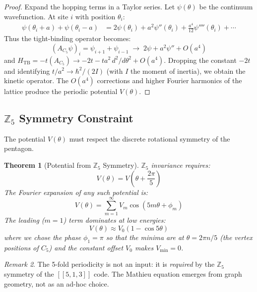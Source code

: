 \documentclass[11pt,a4paper]{article}
\newtheorem{theorem}{Theorem}[section]
\theoremstyle{definition}
\theoremstyle{remark}
\newtheorem{remark}[theorem]{Remark}
\begin{document}
\begin{proof}
Expand the hopping terms in a Taylor series. Let $\psi(\theta)$ be the continuum wavefunction. At site $i$ with position $\theta_i$:
\begin{align}
\psi(\theta_i + a) + \psi(\theta_i - a) &= 2\psi(\theta_i) + a^2\psi''(\theta_i) + \frac{a^4}{12}\psi''''(\theta_i) + \cdots
\end{align}
Thus the tight-binding operator becomes:
\begin{equation}
(A_{C_5}\psi)_i = \psi_{i+1} + \psi_{i-1} \;\longrightarrow\; 2\psi + a^2\psi'' + O(a^4)
\end{equation}
and $H_{\mathrm{TB}} = -t(A_{C_5}) \to -2t - ta^2\,d^2/d\theta^2 + O(a^4)$. Dropping the constant $-2t$ and identifying $t/a^2 \to \hbar^2/(2I)$ (with $I$ the moment of inertia), we obtain the kinetic operator. The $O(a^4)$ corrections and higher Fourier harmonics of the lattice produce the periodic potential $V(\theta)$.
\end{proof}

\subsection{$\mathbb{Z}_5$ Symmetry Constraint}

The potential $V(\theta)$ must respect the discrete rotational symmetry of the pentagon.

\begin{theorem}[Potential from $\mathbb{Z}_5$ Symmetry]
\label{thm:Z5}
$\mathbb{Z}_5$ invariance requires:
\begin{equation}
V(\theta) = V\!\left(\theta + \frac{2\pi}{5}\right)
\end{equation}
The Fourier expansion of any such potential is:
\begin{equation}
V(\theta) = \sum_{m=1}^{\infty} V_m \cos(5m\theta + \phi_m)
\end{equation}
The leading ($m=1$) term dominates at low energies:
\begin{equation}
V(\theta) \approx V_0(1 - \cos 5\theta)
\end{equation}
where we chose the phase $\phi_1 = \pi$ so that the minima are at $\theta = 2\pi n/5$ (the vertex positions of $C_5$) and the constant offset $V_0$ makes $V_{\min} = 0$.
\end{theorem}

\begin{remark}
The 5-fold periodicity is not an input: it is \emph{required} by the $\mathbb{Z}_5$ symmetry of the $[[5,1,3]]$ code. The Mathieu equation emerges from graph geometry, not as an ad-hoc choice.
\end{remark}
\end{document}
